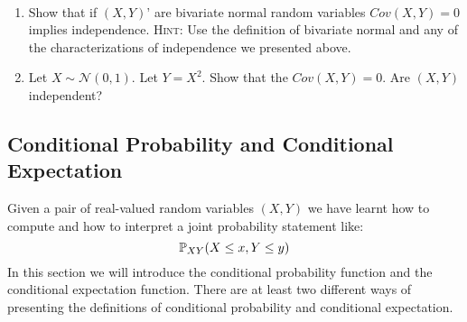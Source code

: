 \documentclass[11pt]{article} %
\begin{document}
\begin{prproblem} \quad \
\begin{enumerate}
\item Show that if $(X,Y)’$ are bivariate normal random variables $Cov(X,Y)=0$ implies independence. {\scshape Hint:} Use the definition of bivariate normal and any of the characterizations of independence we presented above.
\item Let $X \sim \mathcal{N}(0,1)$. Let $Y=X^2$. Show that the $Cov(X,Y) = 0$. Are $(X,Y)$ independent? \end{enumerate}
\end{prproblem}

\newpage








\newpage


\subsection{Conditional Probability and Conditional Expectation}
Given a pair of real-valued random variables $(X, Y)$ we have learnt how to compute and how to interpret a joint probability statement like:
$$\mathbb{P}_{XY} (X \leq x, Y\leq y) $$ 
In this section we will introduce the conditional probability function and the conditional expectation function. There are at least two different ways of presenting the definitions of conditional probability and conditional expectation.  
\end{document}
